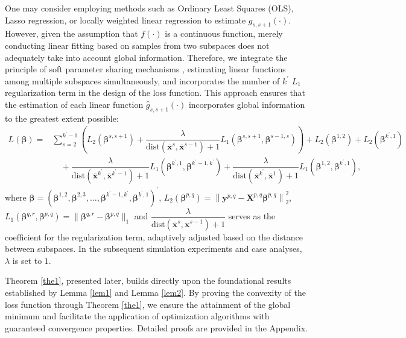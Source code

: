 \documentclass[final,3p,times]{elsarticle}
\begin{document}
One may consider employing methods such as Ordinary Least Squares 
(OLS), Lasso regression, or locally weighted linear regression to 
estimate $g_{s,s+1}(\cdot)$. 
However, given the assumption that $f(\cdot)$ is a continuous 
function, merely conducting linear fitting based on samples from 
two subspaces does not adequately take into account global 
information. Therefore, we integrate the principle of soft 
parameter sharing mechanisms \cite{bib70,bib71}, estimating linear functions 
among multiple subspaces simultaneously, and incorporates the number of $k^\prime$ 
$L_1$ regularization term in the design of the loss function. This approach ensures that the estimation of each linear function 
$\hat{g}_{s,s+1}(\cdot)$ incorporates global information to the 
greatest extent possible:
\begin{equation} 
\label{eq8}
\begin{aligned}
L(\boldsymbol{\beta})=
&\sum\limits_{s=2}^{k^\prime-1}
\left(L_2(\boldsymbol{\beta}^{s,s+1})+\dfrac{\lambda}
{\text{dist}(\overline{\boldsymbol{x}}^{s},
\overline{\boldsymbol{x}}^{s-1})+1} 
L_1(\boldsymbol
{\beta}^{s,s+1},\boldsymbol{\beta}^{s-1,s}) \right) 
+L_2(\boldsymbol{\beta}^{1,2})+L_2(\boldsymbol{\beta}
^{k^\prime,1}) \\
&\quad+\dfrac{\lambda}{\text{dist}(
  \overline{\boldsymbol{x}}^{k^\prime},\overline
  {\boldsymbol{x}}^{k^\prime-1})+1}L_1(\boldsymbol{\beta}^{k^\prime,1},
  \boldsymbol{\beta}^{k^\prime-1,k^\prime})+\dfrac{\lambda}{\text{dist}(
\overline{\boldsymbol{x}}^{k^\prime},\overline
{\boldsymbol{x}}^{1})+1}L_1(\boldsymbol{\beta}^{1,2},
\boldsymbol{\beta}^{k^\prime,1}), 
\end{aligned}
\end{equation}
where $\boldsymbol{\beta}=\left(\boldsymbol{\beta}
^{1,2},\boldsymbol{\beta}^{2,3},\ldots,\boldsymbol
{\beta}^{k^\prime-1,k^\prime},\boldsymbol{\beta}^
{k^\prime,1}\right)^\prime$, $L_2(\boldsymbol{\beta}
^{p,q})=\left\|\boldsymbol{y}^{p, q}-\boldsymbol{X}^{p, q} 
\boldsymbol{\beta}^{p, q}\right\|_{2}^{2}$, 
$L_1(\boldsymbol{\beta}^{q,r},\boldsymbol{\beta}^
{p,q})=\|\boldsymbol{\beta}^{q,r}-\boldsymbol{\beta}
^{p,q}\|_1$ and $\dfrac{\lambda}{\text{dist}(
\overline{\boldsymbol{x}}^{s},\overline{\boldsymbol{x}}
^{s-1})+1}$ serves as the coefficient for the 
regularization term, adaptively adjusted based on 
the distance between subspaces. In the subsequent 
simulation experiments and case analyses, $\lambda$ 
is set to $1$.

Theorem \ref{the1}, presented later, builds directly upon the 
foundational results established by Lemma \ref{lem1} and 
Lemma \ref{lem2}. By proving the convexity of the loss 
function through Theorem \ref{the1}, we ensure the attainment 
of the global minimum and facilitate the application 
of optimization algorithms with guaranteed convergence 
properties. Detailed proofs are provided in the 
Appendix.
\end{document}
